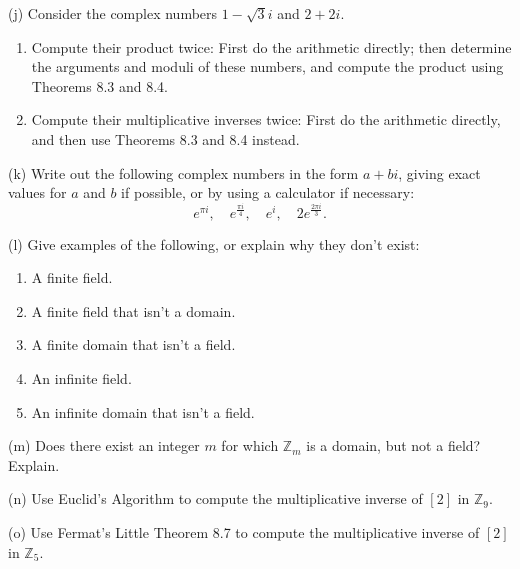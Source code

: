 \begin{problem}[Warmup]{(j)}
    Consider the complex numbers $1 - \sqrt{3}i$ and $2 + 2i$.
    \begin{enumerate}
        \item[(a)] Compute their product twice: First do the arithmetic directly; then determine the arguments and moduli of these numbers, and compute the product using Theorems 8.3 and 8.4.
        \item[(b)] Compute their multiplicative inverses twice: First do the arithmetic directly, and then use Theorems 8.3 and 8.4 instead.
    \end{enumerate}
\end{problem}
\unsolved

\begin{problem}[Warmup]{(k)}
    Write out the following complex numbers in the form $a + bi$, giving exact values for $a$ and $b$ if possible, or by using a calculator if necessary: \[e^{\pi i}, \quad e^{\frac{\pi i}{4}}, \quad e^{i}, \quad 2e^{\frac{2\pi i}{3}}.\]
\end{problem}
\unsolved

\begin{problem}[Warmup]{(l)}
    Give examples of the following, or explain why they don't exist:
    \begin{enumerate}
        \item[(a)] A finite field.
        \item[(b)] A finite field that isn't a domain.
        \item[(c)] A finite domain that isn't a field.
        \item[(d)] An infinite field.
        \item[(e)] An infinite domain that isn't a field.
    \end{enumerate}
\end{problem}
\unsolved

\begin{problem}[Warmup]{(m)}
    Does there exist an integer $m$ for which $\mathbb{Z}_m$ is a domain, but not a field? Explain.
\end{problem}
\unsolved

\begin{problem}[Warmup]{(n)}
    Use Euclid's Algorithm to compute the multiplicative inverse of $[2]$ in $\mathbb{Z}_9$.
\end{problem}
\unsolved

\begin{problem}[Warmup]{(o)}
    Use Fermat's Little Theorem 8.7 to compute the multiplicative inverse of $[2]$ in $\mathbb{Z}_5$.
\end{problem}
\unsolved

